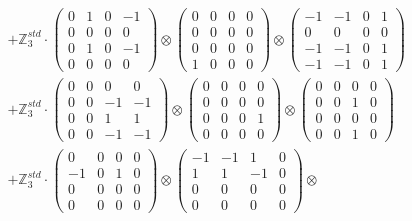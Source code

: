 \documentclass{article}
\begin{document}
{\begin{align}
        &+ \label{Rs16-Rc11-Solution-24-c22} \mathbb{Z}_3^{std} \cdot 
            \begin{pmatrix} 0 & 1 & 0 & -1 \\ 0 & 0 & 0 & 0 \\ 0 & 1 & 0 & -1 \\ 0 & 0 & 0 & 0 \end{pmatrix} \otimes 
            \begin{pmatrix} 0 & 0 & 0 & 0 \\ 0 & 0 & 0 & 0 \\ 0 & 0 & 0 & 0 \\ 1 & 0 & 0 & 0 \end{pmatrix} \otimes 
            \begin{pmatrix} -1 & -1 & 0 & 1 \\ 0 & 0 & 0 & 0 \\ -1 & -1 & 0 & 1 \\ -1 & -1 & 0 & 1 \end{pmatrix} \\ 
        &+ \label{Rs16-Rc11-Solution-24-c23} \mathbb{Z}_3^{std} \cdot 
            \begin{pmatrix} 0 & 0 & 0 & 0 \\ 0 & 0 & -1 & -1 \\ 0 & 0 & 1 & 1 \\ 0 & 0 & -1 & -1 \end{pmatrix} \otimes 
            \begin{pmatrix} 0 & 0 & 0 & 0 \\ 0 & 0 & 0 & 0 \\ 0 & 0 & 0 & 1 \\ 0 & 0 & 0 & 0 \end{pmatrix} \otimes 
            \begin{pmatrix} 0 & 0 & 0 & 0 \\ 0 & 0 & 1 & 0 \\ 0 & 0 & 0 & 0 \\ 0 & 0 & 1 & 0 \end{pmatrix} \\ 
        &+ \label{Rs16-Rc11-Solution-24-c24} \mathbb{Z}_3^{std} \cdot 
            \begin{pmatrix} 0 & 0 & 0 & 0 \\ -1 & 0 & 1 & 0 \\ 0 & 0 & 0 & 0 \\ 0 & 0 & 0 & 0 \end{pmatrix} \otimes 
            \begin{pmatrix} -1 & -1 & 1 & 0 \\ 1 & 1 & -1 & 0 \\ 0 & 0 & 0 & 0 \\ 0 & 0 & 0 & 0 \end{pmatrix} \otimes 

\end{align}}
\end{document}
